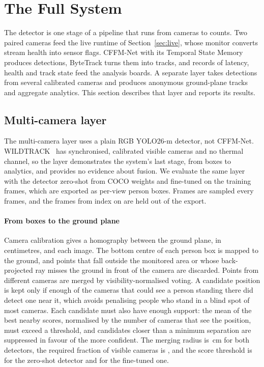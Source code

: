 \section{The Full System}
\label{sec:system}
The detector is one stage of a pipeline that runs from cameras to counts. Two paired cameras feed the live runtime of Section~\ref{sec:live}, whose monitor converts stream health into sensor flags. CFFM-Net with its Temporal State Memory produces detections, ByteTrack turns them into tracks, and records of latency, health and track state feed the analysis boards. A separate layer takes detections from several calibrated cameras and produces anonymous ground-plane tracks and aggregate analytics. This section describes that layer and reports its results.

\subsection{Multi-camera layer}
The multi-camera layer uses a plain RGB YOLO26-m detector, not CFFM-Net. WILDTRACK~\cite{chavdarova2018wildtrack} has \cfgCamViews{} synchronised, calibrated visible cameras and no thermal channel, so the layer demonstrates the system's last stage, from boxes to analytics, and provides no evidence about fusion. We evaluate the same layer with the detector zero-shot from COCO weights and fine-tuned on the training frames, which are exported as per-view person boxes. Frames are sampled every \cfgWtStep{} frames, and the frames from index \cfgWtTestFrom{} on are held out of the export.

\paragraph{From boxes to the ground plane}
Camera calibration gives a homography between the ground plane, in centimetres, and each image. The bottom centre of each person box is mapped to the ground, and points that fall outside the monitored area or whose back-projected ray misses the ground in front of the camera are discarded. Points from different cameras are merged by visibility-normalised voting. A candidate position is kept only if enough of the cameras that could see a person standing there did detect one near it, which avoids penalising people who stand in a blind spot of most cameras. Each candidate must also have enough support: the mean of the best nearby scores, normalised by the number of cameras that see the position, must exceed a threshold, and candidates closer than a minimum separation are suppressed in favour of the more confident. The merging radius is \camFusionFineTunedRadius{}\,cm for both detectors, the required fraction of visible cameras is \camFusionFineTunedMinRatio{}, and the score threshold is \camFusionZeroShotMinScore{} for the zero-shot detector and \camFusionFineTunedMinScore{} for the fine-tuned one.

